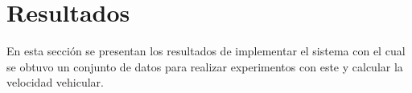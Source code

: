\chapter{Resultados}

En esta sección se presentan los resultados de implementar el sistema con el cual se obtuvo un conjunto de datos para realizar experimentos con este y calcular la velocidad vehicular.









